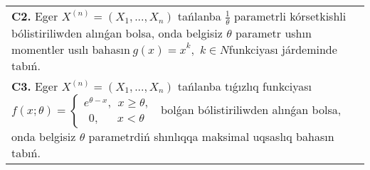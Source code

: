 \documentclass{article}
\begin{document}
\begin{tabular}{m{17cm}}
\textbf{C2.} 
Eger \(X^{(n)} = \left( X_{1},...,X_{n} \right)\) tańlanba \(\frac{1}{\theta}\) parametrli kórsetkishli bólistiriliwden alınǵan bolsa, onda belgisiz \(\theta\) parametr ushın momentler usılı bahasın\({\ g(x) = x}^{k},\) \(k \in N\)funkciyası járdeminde tabıń.
 \\
\textbf{C3.} 
Eger \(X^{(n)} = \left( X_{1},...,X_{n} \right)\) tańlanba tıǵızlıq funkciyası
$f(x;\theta) = \left\{ \begin{matrix}
e^{\theta - x},\ \ x \geq \theta, \\
\ \ 0,\ \ \ \ \ \ \ x < \theta
\end{matrix} \right.\ $
bolǵan bólistiriliwden alınǵan bolsa, onda belgisiz \(\theta\) parametrdiń shınlıqqa maksimal uqsaslıq bahasın tabıń.
 \\

\end{tabular}
\vspace{1cm}
\end{document}
